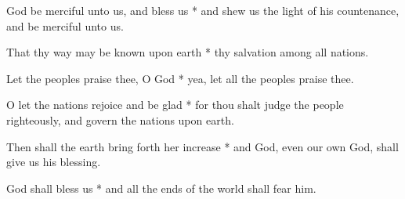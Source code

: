 God be merciful unto us, and bless us * and shew us the light of his countenance, and be merciful unto us.

That thy way may be known upon earth * thy salvation among all nations.

Let the peoples praise thee, O God * yea, let all the peoples praise thee.

O let the nations rejoice and be glad * for thou shalt judge the people righteously, and govern the nations upon earth.

Then shall the earth bring forth her increase * and God, even our own God, shall give us his blessing.

God shall bless us * and all the ends of the world shall fear him.